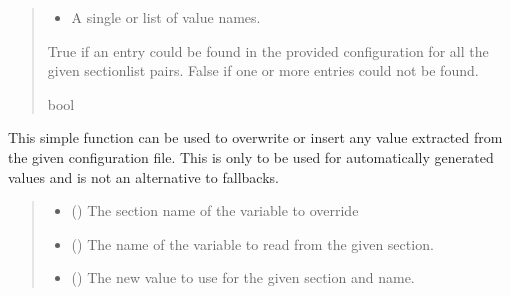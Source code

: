 \documentclass[letterpaper,10pt,english]{sphinxmanual}
\begin{document}
\begin{fulllineitems}
\begin{fulllineitems}
\begin{quote}
\begin{description}
\begin{itemize}
\item {} 
\sphinxAtStartPar
{} \textendash{} A single or list of value names.

\end{itemize}

\sphinxAtStartPar
True if an entry could be found in the provided configuration
for all the given section\sphinxhyphen{}list pairs. False if one or more entries
could not be found.

\sphinxAtStartPar
bool

\end{description}\end{quote}

\end{fulllineitems}


\begin{fulllineitems}
\label{\detokenize{modules/input/config_handler:qnav.input.config_handler.ConfigHandler.overwrite_value}}
\pysigstartsignatures
{}
\pysigstopsignatures
\sphinxAtStartPar
This simple function can be used to overwrite or insert any value
extracted from the given configuration file. This is only to be used
for automatically generated values and is not an alternative to
fallbacks.
\begin{quote}\begin{description}
\begin{itemize}
\item {} 
\sphinxAtStartPar
{} () \textendash{} The section name of the variable to override

\item {} 
\sphinxAtStartPar
{} () \textendash{} The name of the variable to read from the given section.

\item {} 
\sphinxAtStartPar
{} (\sphinxstyleliteralemphasis{\sphinxupquote{, }}\sphinxstyleliteralemphasis{\sphinxupquote{, }}) \textendash{} The new value to use for the given section and name.


\end{itemize}
\end{description}
\end{quote}
\end{fulllineitems}
\end{fulllineitems}
\end{document}
